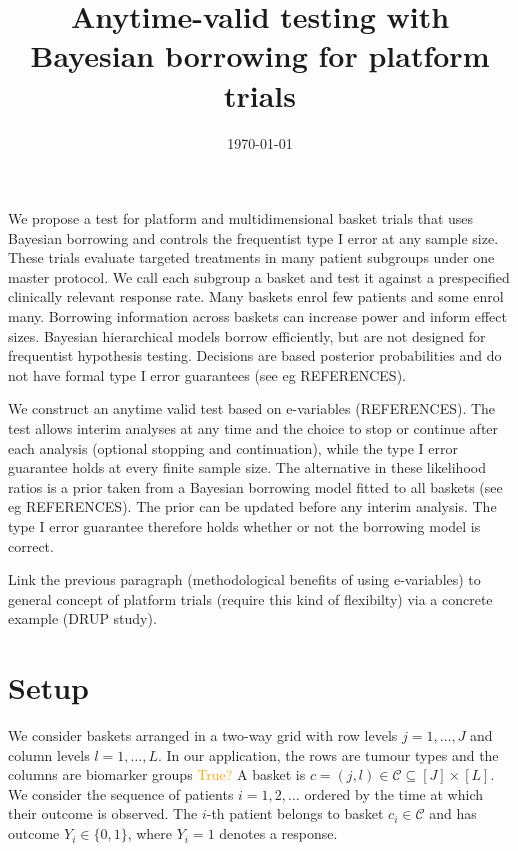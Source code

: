 \documentclass[11pt,a4paper]{article}
\title{Anytime-valid testing with Bayesian borrowing for platform trials}
\date{\today}
\theoremstyle{definition}
\theoremstyle{remark}
\newcommand{\C}{\mathcal{C}}
\begin{document}
\maketitle

We propose a test for platform and multidimensional basket trials that uses Bayesian borrowing and controls the frequentist type I error at any sample size.
These trials evaluate targeted treatments in many patient subgroups under one master protocol.
We call each subgroup a basket and test it against a prespecified clinically relevant response rate.
Many baskets enrol few patients and some enrol many.
Borrowing information across baskets can increase power and inform effect sizes.
Bayesian hierarchical models borrow efficiently, but are not designed for frequentist hypothesis testing.
Decisions are based posterior probabilities and do not have formal type I error guarantees (see eg REFERENCES).

We construct an anytime valid test based on e-variables (REFERENCES).
The test allows interim analyses at any time and the choice to stop or continue after each analysis (optional stopping and continuation), while the type I error guarantee holds at every finite sample size.
The alternative in these likelihood ratios is a prior taken from a Bayesian borrowing model fitted to all baskets (see eg REFERENCES).
The prior can be updated before any interim analysis.
The type I error guarantee therefore holds whether or not the borrowing model is correct.

Link the previous paragraph (methodological benefits of using e-variables) to general concept of platform trials (require this kind of flexibilty) via a concrete example (DRUP study).

\section{Setup}\label{sec:setup}

We consider baskets arranged in a two-way grid with row levels $j = 1,\dots,J$ and column levels $l = 1,\dots,L$.
In our application, the rows are tumour types and the columns are biomarker groups \textcolor{orange}{True?}
A basket is $c = (j,l) \in \C \subseteq [J]\times[L]$.
We consider the sequence of patients $i = 1, 2, \dots$ ordered by the time at which their outcome is observed.
The $i$-th patient belongs to basket $c_i \in \C$ and has outcome $Y_i \in \{0,1\}$, where $Y_i = 1$ denotes a response.
\end{document}
